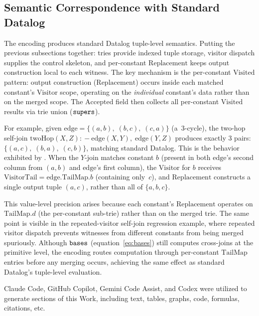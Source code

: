 \subsection{Semantic Correspondence with Standard Datalog}
\label{sec:datalog-semantics}

The encoding produces standard Datalog tuple-level semantics.
Putting the previous subsections together: tries provide indexed
tuple storage, visitor dispatch supplies the control skeleton,
and per-constant $\mathrm{Replacement}$ keeps output
construction local to each witness.
The key mechanism is the per-constant $\mathrm{Visited}$
pattern: output construction ($\mathrm{Replacement}$)
occurs inside each matched constant's $\mathrm{Visitor}$
scope, operating on the \emph{individual} constant's data
rather than on the merged scope.
The $\mathrm{Accepted}$ field then collects all per-constant
$\mathrm{Visited}$ results via trie union ($\mathtt{supers}$).

For example, given $\mathrm{edge} = \{(a,b),\; (b,c),\; (c,a)\}$
(a~3-cycle), the two-hop self-join
$\mathrm{twoHop}(X, Z) \mathrel{{:}\!{-}} \mathrm{edge}(X, Y),\; \mathrm{edge}(Y, Z)$
produces exactly $3$ pairs:
$\{(a,c),\; (b,a),\; (c,b)\}$, matching standard Datalog.
This is the behavior exhibited by
.
When the $Y$-join matches constant $b$ (present in both
  $\mathrm{edge}$'s second column from $(a,b)$ and
$\mathrm{edge}$'s first column), the $\mathrm{Visitor}$ for
$b$ receives $\mathrm{VisitorTail} = \mathrm{edge}.\mathrm{TailMap}.b$
(containing only~$c$), and $\mathrm{Replacement}$ constructs
a single output tuple $(a, c)$, rather than all of $\{a,b,c\}$.

This value-level precision arises because each constant's
$\mathrm{Replacement}$ operates on $\mathrm{TailMap}.d$
(the per-constant sub-trie) rather than on the merged
trie.
The same point is visible in
the repeated-visitor self-join regression example,
where repeated visitor dispatch prevents witnesses from
different constants from being merged spuriously.
Although $\mathtt{bases}$ (equation~\ref{eq:bases}) still computes
cross-joins at the primitive level, the encoding routes
computation through per-constant $\mathrm{TailMap}$ entries
before any merging occurs, achieving the same effect as
standard Datalog's tuple-level evaluation.

\begin{acks}
  Claude Code, GitHub Copilot, Gemini Code Assist, and Codex were utilized to generate sections of this Work,
  including text, tables, graphs, code, formulas, citations, etc.
\end{acks}


